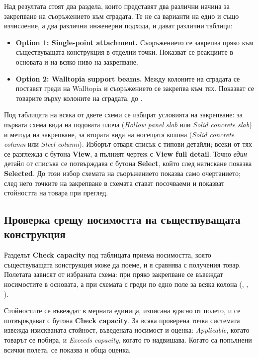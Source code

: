 Над резултата стоят два раздела, които представят два различни начина за закрепване на
съоръжението към сградата. Те не са варианти на едно и също изчисление, а два различни
инженерни подхода, и дават различни таблици:

\begin{itemize}[topsep=2pt,itemsep=2pt,leftmargin=*]
\item \textbf{Option 1: Single-point attachment.} Съоръжението се закрепва пряко към
      съществуващата конструкция в отделни точки. Показват се реакциите в основата и на
      всяко ниво на закрепване.
\item \textbf{Option 2: Walltopia support beams.} Между колоните на сградата се
      поставят греди на Walltopia и съоръжението се закрепва към тях. Показват се
      товарите върху колоните на сградата,  до .
\end{itemize}

Под таблицата на всяка от двете схеми се избират условията на закрепване: за първата
схема вида на подовата плоча (\emph{Hollow panel slab} или \emph{Solid concrete slab})
и метода на закрепване, за втората вида на носещата колона (\emph{Solid concrete
column} или \emph{Steel column}). Изборът отваря списък с типови детайли; всеки от тях
се разглежда с бутона \textbf{View}, а пълният чертеж с \textbf{View full detail}.
Точно \emph{един} детайл от списъка се потвърждава с бутона \textbf{Select}, който след
натискане показва \textbf{Selected}. До този избор схемата на съоръжението показва само
очертанието; след него точките на закрепване в схемата стават посочваеми и показват
стойността на товара при преглед.

\subsection{Проверка срещу носимостта на съществуващата конструкция}
\label{subsec:ug-capacity}

Разделът \textbf{Check capacity} под таблицата приема носимостта, която съществуващата
конструкция може да поеме, и я сравнява с получения товар. Полетата зависят от избраната
схема: при пряко закрепване се въвеждат носимостите в основата, а при схемата с греди
по едно поле за всяка колона (, , ).

Стойностите се въвеждат в мерната единица, изписана вдясно от полето, и се потвърждават
с бутона \textbf{Check capacity}. За всяка проверена точка системата извежда изискваната
стойност, въведената носимост и оценка: \emph{Applicable}, когато товарът се побира, и
\emph{Exceeds capacity}, когато го надвишава. Когато са попълнени всички полета, се
показва и обща оценка.

